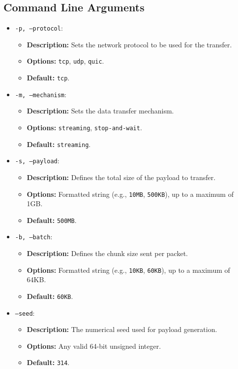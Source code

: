 \documentclass[12pt,a4paper]{article}
\begin{document}
\subsection{Command Line Arguments}
\begin{itemize}
    \item \texttt{-p, --protocol}:
    \begin{itemize}
        \item \textbf{Description:} Sets the network protocol to be used for the transfer.
        \item \textbf{Options:} \texttt{tcp}, \texttt{udp}, \texttt{quic}.
        \item \textbf{Default:} \texttt{tcp}.
    \end{itemize}

    \item \texttt{-m, --mechanism}:
    \begin{itemize}
        \item \textbf{Description:} Sets the data transfer mechanism.
        \item \textbf{Options:} \texttt{streaming}, \texttt{stop-and-wait}.
        \item \textbf{Default:} \texttt{streaming}.
    \end{itemize}

    \item \texttt{-s, --payload}:
    \begin{itemize}
        \item \textbf{Description:} Defines the total size of the payload to transfer.
        \item \textbf{Options:} Formatted string (e.g., \texttt{10MB}, \texttt{500KB}), up to a maximum of 1GB.
        \item \textbf{Default:} \texttt{500MB}.
    \end{itemize}

    \item \texttt{-b, --batch}:
    \begin{itemize}
        \item \textbf{Description:} Defines the chunk size sent per packet.
        \item \textbf{Options:} Formatted string (e.g., \texttt{10KB}, \texttt{60KB}), up to a maximum of 64KB.
        \item \textbf{Default:} \texttt{60KB}.
    \end{itemize}

    \item \texttt{--seed}:
    \begin{itemize}
        \item \textbf{Description:} The numerical seed used for payload generation.
        \item \textbf{Options:} Any valid 64-bit unsigned integer.
        \item \textbf{Default:} \texttt{314}.
    \end{itemize}


\end{itemize}
\end{document}
